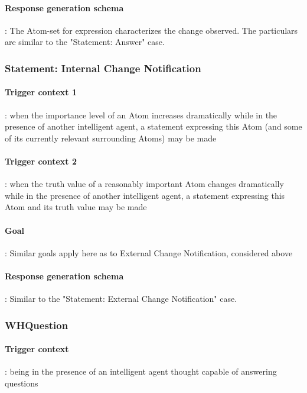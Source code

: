 \documentclass[10pt]{article}
\begin{document}
\paragraph{Response generation schema}:  The Atom-set for expression characterizes the change observed.  The particulars are similar to the "Statement: Answer" case.

\subsubsection{Statement: Internal Change Notification}

\paragraph{Trigger context 1}: when the importance level of an Atom increases dramatically while in the presence of another intelligent agent, a statement expressing this Atom (and some of its currently relevant surrounding Atoms) may be made

\paragraph{Trigger context 2}: when the truth value of a reasonably important Atom changes dramatically while in the presence of another intelligent agent, a statement expressing this Atom and its truth value may be made

\paragraph{Goal}: Similar goals apply here as to External Change Notification, considered above

\paragraph{Response generation schema}:  Similar to the "Statement: External Change Notification" case.

\subsubsection{WHQuestion}  

\paragraph{Trigger context}: being in the presence of an intelligent agent thought capable of answering questions
\end{document}
